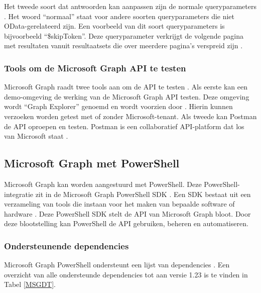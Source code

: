 Het tweede soort dat antwoorden kan aanpassen zijn de normale queryparameters \autocite{Microsoft2023vv}. Het woord “normaal” staat voor andere soorten queryparameters die niet OData-gerelateerd zijn. Een voorbeeld van dit soort queryparameters is bijvoorbeeld “\$skipToken”. Deze queryparameter verkrijgt de volgende pagina met resultaten vanuit resultaatsets die over meerdere pagina's verspreid zijn \autocite{Microsoft2023g}. 

\subsubsection{Tools om de Microsoft Graph API te testen}


Microsoft Graph raadt twee tools aan om de \Ac{API} te testen \autocite{Microsoft2023vv}. Als eerste kan een demo-omgeving de werking van de Microsoft Graph \Ac{API} testen. Deze omgeving wordt “Graph Explorer” genoemd en wordt voorzien door \textcite{Microsoft2023h}. Hierin kunnen verzoeken worden getest met of zonder Microsoft-tenant. Als tweede kan Postman de \Ac{API} oproepen en testen. Postman is een collaboratief \ac{API}-platform dat los van Microsoft staat \autocite{Postman2023}.

\subsection{Microsoft Graph met PowerShell}


Microsoft Graph kan worden aangestuurd met PowerShell. Deze PowerShell-integratie zit in de Microsoft Graph PowerShell \ac{SDK} \autocite{Microsoft2023j}. Een \ac{SDK} bestaat uit een verzameling van tools die instaan voor het maken van bepaalde software of hardware \autocite{RedHat2020}. Deze PowerShell \ac{SDK} stelt de \ac{API} van Microsoft Graph bloot. Door deze blootstelling kan PowerShell de \ac{API} gebruiken, beheren en automatiseren.


\subsubsection{Ondersteunende dependencies}


Microsoft Graph PowerShell ondersteunt een lijst van dependencies \autocite{Microsoft2023k}. Een overzicht van alle ondersteunde dependencies tot aan versie 1.23 is te vinden in Tabel \ref{MSGDT}. 

